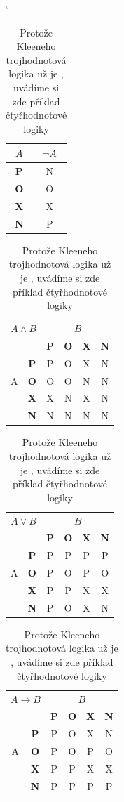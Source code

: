 \documentclass[11pt, titlepage, a4paper]{article}
\begin{document}
      \bigskip
      \begin{table}[h]
      \begin{center}
      \catcode`
      \begin{tabular}{|c|c|} \hline
        $A$ & $\neg A$\\ \hline
        \textbf{P} & N\\ \hline
        \textbf{O} & O\\ \hline
        \textbf{X} & X\\ \hline
        \textbf{N} & P\\ \hline
      \end{tabular}
            \begin{tabular}{|c|c|c|c|c|c|} \hline
        \multicolumn{2}{|c|}{$A \wedge B$} & \multicolumn{4}{|c|}{$B$}\\ \cline{3-6}
        \multicolumn{2}{|c|}{} & \textbf{P} & \textbf{O} & \textbf{X} & \textbf{N}\\ \hline
        & \textbf{P} & P & O & X & N\\ \cline{2-6}
        A & \textbf{O} & O & O & N & N\\ \cline{2-6}
        & \textbf{X} & X & N & X & N\\ \cline{2-6}
        & \textbf{N} & N & N & N & N\\ \hline
      \end{tabular}
      \begin{tabular}{|c|c|c|c|c|c|} \hline
        \multicolumn{2}{|c|}{$A \vee B$} & \multicolumn{4}{|c|}{$B$}\\ \cline{3-6}
        \multicolumn{2}{|c|}{} & \textbf{P} & \textbf{O} & \textbf{X} & \textbf{N}\\ \hline
        & \textbf{P} & P & P & P & P\\ \cline{2-6}
        A & \textbf{O} & P & O & P & O\\ \cline{2-6}
        & \textbf{X} & P & P & X & X\\ \cline{2-6}
        & \textbf{N} & P & O & X & N\\ \hline
      \end{tabular}
      \begin{tabular}{|c|c|c|c|c|c|} \hline
        \multicolumn{2}{|c|}{$A \rightarrow B$} & \multicolumn{4}{|c|}{$B$}\\ \cline{3-6}
        \multicolumn{2}{|c|}{} & \textbf{P} & \textbf{O} & \textbf{X} & \textbf{N}\\ \hline
        & \textbf{P} & P & O & X & N\\ \cline{2-6}
        A & \textbf{O} & P & O & P & O\\ \cline{2-6}
        & \textbf{X} & P & P & X & X\\ \cline{2-6}
        & \textbf{N} & P & P & P & P\\ \hline
      \end{tabular}
      \caption{Protože Kleeneho trojhodnotová logika už je , uvádíme si zde příklad
				čtyřhodnotové logiky}
      \label{tab:kleen}
      \end{center}
      \end{table}
\end{document}
